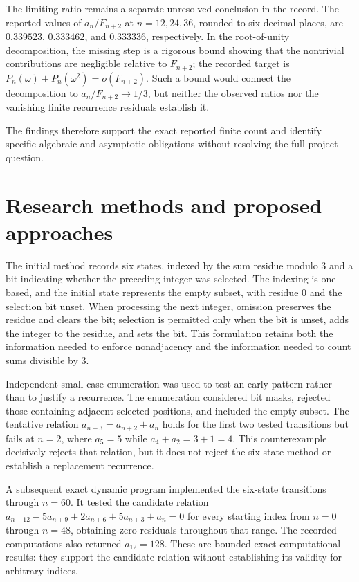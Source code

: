 \documentclass[11pt]{article}
\begin{document}
The limiting ratio remains a separate unresolved conclusion in the record. The reported values of $a_n/F_{n+2}$ at $n=12,24,36$, rounded to six decimal places, are $0.339523$, $0.333462$, and $0.333336$, respectively. In the root-of-unity decomposition, the missing step is a rigorous bound showing that the nontrivial contributions are negligible relative to $F_{n+2}$; the recorded target is $P_n(\omega)+P_n(\omega^2)=o(F_{n+2})$. Such a bound would connect the decomposition to $a_n/F_{n+2}\to1/3$, but neither the observed ratios nor the vanishing finite recurrence residuals establish it.

The findings therefore support the exact reported finite count and identify specific algebraic and asymptotic obligations without resolving the full project question.

\section{Research methods and proposed approaches}
The initial method records six states, indexed by the sum residue modulo $3$ and a bit indicating whether the preceding integer was selected. The indexing is one-based, and the initial state represents the empty subset, with residue $0$ and the selection bit unset. When processing the next integer, omission preserves the residue and clears the bit; selection is permitted only when the bit is unset, adds the integer to the residue, and sets the bit. This formulation retains both the information needed to enforce nonadjacency and the information needed to count sums divisible by $3$.

Independent small-case enumeration was used to test an early pattern rather than to justify a recurrence. The enumeration considered bit masks, rejected those containing adjacent selected positions, and included the empty subset. The tentative relation $a_{n+3}=a_{n+2}+a_n$ holds for the first two tested transitions but fails at $n=2$, where $a_5=5$ while $a_4+a_2=3+1=4$. This counterexample decisively rejects that relation, but it does not reject the six-state method or establish a replacement recurrence.

A subsequent exact dynamic program implemented the six-state transitions through $n=60$. It tested the candidate relation $a_{n+12}-5a_{n+9}+2a_{n+6}+5a_{n+3}+a_n=0$ for every starting index from $n=0$ through $n=48$, obtaining zero residuals throughout that range. The recorded computations also returned $a_{12}=128$. These are bounded exact computational results: they support the candidate relation without establishing its validity for arbitrary indices.
\end{document}
